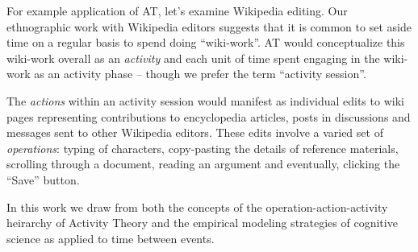 For example application of AT, let's examine Wikipedia editing.  Our ethnographic work with Wikipedia editors suggests that it is common to set aside time on a regular basis to spend doing ``wiki-work''.  AT would conceptualize this wiki-work overall as an \emph{activity} and each unit of time spent engaging in the wiki-work as an activity phase -- though we prefer the term ``activity session''.

The \emph{actions} within an activity session would manifest as individual edits to wiki pages representing contributions to encyclopedia articles, posts in discussions and messages sent to other Wikipedia editors.  These edits involve a varied set of \emph{operations}: typing of characters, copy-pasting the details of reference materials, scrolling through a document, reading an argument and eventually, clicking the ``Save'' button.

In this work we draw from both the concepts of the operation-action-activity heirarchy of Activity Theory and the empirical modeling strategies of cognitive science as applied to time between events.
